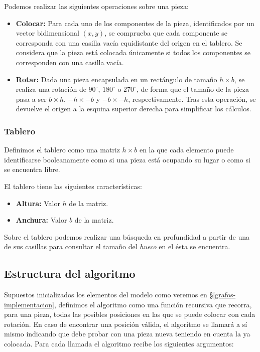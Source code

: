 Podemos realizar las siguientes operaciones sobre una pieza:

\begin{itemize}
	\item\textbf{Colocar:} Para cada uno de los componentes de la pieza, identificados por un vector bidimensional $(x,y)$, se comprueba que cada componente se corresponda con una casilla vacía equidistante del origen en el tablero. Se considera que la pieza está colocada únicamente si todos los componentes se corresponden con una casilla vacía.
	\item\textbf{Rotar:} Dada una pieza encapsulada en un rectángulo de tamaño $h\times b$, se realiza una rotación de $90^{\circ}$, $180^{\circ}$ o $270^{\circ}$, de forma que el tamaño de la pieza pasa a ser $b\times h$, $-h\times-b$ y $-b\times-h$, respectivamente. Tras esta operación, se devuelve el origen a la esquina superior derecha para simplificar los cálculos.
\end{itemize}

\subsubsection{Tablero}\label{grafos-algoritmo-definiciones-tablero}

Definimos el tablero como una matriz $h\times b$ en la que cada elemento puede identificarse booleanamente como  si una pieza está ocupando su lugar o como  si se encuentra libre.

El tablero tiene las siguientes características:

\begin{itemize}
	\item\textbf{Altura:} Valor $h$ de la matriz.
	\item\textbf{Anchura:} Valor $b$ de la matriz.
\end{itemize}

Sobre el tablero podemos realizar una búsqueda en profundidad a partir de una de sus casillas para consultar el tamaño del \textit{hueco} en el ésta se encuentra.

\subsection{Estructura del algoritmo}\label{grafos-algoritmo-estructura}

Supuestos inicializados los elementos del modelo como veremos en \S\ref{grafos-implementacion}, definimos el algoritmo como una función recursiva que recorra, para una pieza, todas las posibles posiciones en las que se puede colocar con cada rotación.
En caso de encontrar una posición válida, el algoritmo se llamará a sí mismo indicando que debe probar con una pieza nueva teniendo en cuenta la ya colocada.
Para cada llamada el algoritmo recibe los siguientes argumentos:

